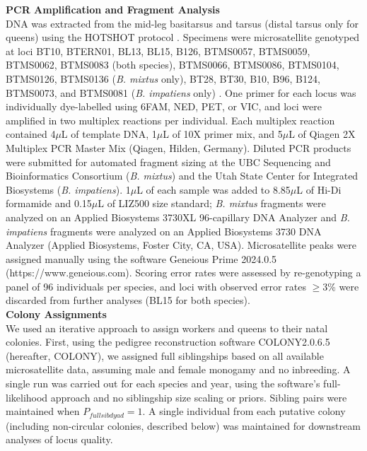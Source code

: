 \documentclass[11pt]{article}
\begin{document}
\noindent \textbf{PCR Amplification and Fragment Analysis} \\
DNA was extracted from the mid-leg basitarsus and tarsus (distal tarsus only for queens) using the HOTSHOT protocol \parencite{truett_preparation_2000}. Specimens were microsatellite genotyped at loci BT10, BTERN01, BL13, BL15, B126, BTMS0057, BTMS0059, BTMS0062, BTMS0083 (both species), BTMS0066, BTMS0086, BTMS0104, BTMS0126, BTMS0136 (\textit{B. mixtus} only), BT28, BT30, B10, B96, B124, BTMS0073, and BTMS0081 (\textit{B. impatiens} only) \parencite{estoup_monoandry_1995, estoup_genetic_1996, reber_funk_microsatellite_2006,stolle_novel_2009}. One primer for each locus was individually dye-labelled using 6FAM, NED, PET, or VIC, and loci were amplified in two multiplex reactions per individual. Each multiplex reaction contained 4$\mu$L of template DNA, 1$\mu$L of 10X primer mix, and 5$\mu$L of Qiagen 2X Multiplex PCR Master Mix (Qiagen, Hilden, Germany). Diluted PCR products were submitted for automated fragment sizing at the UBC Sequencing and Bioinformatics Consortium (\textit{B. mixtus}) and the Utah State Center for Integrated Biosystems (\textit{B. impatiens}). 1$\mu$L of each sample was added to 8.85$\mu$L of Hi-Di formamide and 0.15$\mu$L of LIZ500 size standard; \textit{B. mixtus} fragments were analyzed on an Applied Biosystems 3730XL 96-capillary DNA Analyzer and \textit{B. impatiens} fragments were analyzed on an Applied Biosystems 3730 DNA Analyzer (Applied Biosystems, Foster City, CA, USA). Microsatellite peaks were assigned manually using the software Geneious Prime 2024.0.5 (https://www.geneious.com). Scoring error rates were assessed by re-genotyping a panel of 96 individuals per species, and loci with observed error rates $\geq$3\% were discarded from further analyses (BL15 for both species). \\

\noindent \textbf{Colony Assignments} \\
We used an iterative approach to assign workers and queens to their natal colonies. First, using the pedigree reconstruction software COLONY2.0.6.5 \parencite{jones_colony_2010} (hereafter, COLONY), we assigned full siblingships based on all available microsatellite data, assuming male and female monogamy and no inbreeding. A single run was carried out for each species and year, using the software's full-likelihood approach and no siblingship size scaling or priors. Sibling pairs were maintained when $P_{fullsib dyad} = 1$. A single individual from each putative colony (including non-circular colonies, described below) was maintained for downstream analyses of locus quality.
\end{document}
